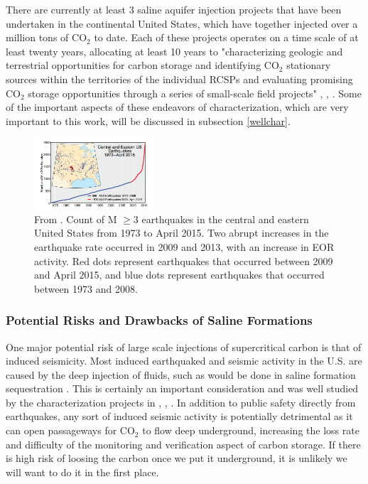 \documentclass[letterpaper, 12pt]{article}
\begin{document}
\par There are currently at least 3 saline aquifer injection projects that have been undertaken in the continental United States, which have together injected over a million tons of CO$_2$ to date. Each of these projects operates on a time scale of at least twenty years, allocating at least 10 years to "characterizing geologic and terrestrial opportunities for carbon storage and identifying CO$_2$ stationary sources within the territories of the individual RCSPs and evaluating promising CO$_2$ storage opportunities through a series of small-scale field projects"  \cite{midwestinject}, \cite{midwestinject2}, \cite{southeastinject}. Some of the important aspects of these endeavors of characterization, which are very important to this work, will be discussed in subsection \ref{wellchar}. 
\setlength{\intextsep}{2pt}%
\begin{figure}%
  \centering
  \includegraphics[width=0.4\textwidth]{induced}
   \caption{\label{inducedfig} From \cite{seis_induced}. Count of M $\geq3$ earthquakes in the central and eastern United States from 1973 to April 2015. Two abrupt increases in the earthquake rate occurred in 2009 and 2013, with an increase in EOR activity. Red dots represent earthquakes that occurred between 2009 and April 2015, and blue dots represent earthquakes that occurred between 1973 and 2008.}
\end{figure}
\subsubsection{Potential Risks and Drawbacks of Saline Formations} 
One major potential risk of large scale injections of supercritical carbon is that of induced seismicity. Most induced earthquaked and seismic activity in the U.S. are caused by the deep injection of fluids, such as would be done in saline formation sequestration \cite{induced}. This is certainly an important consideration and was well studied by the characterization projects in \cite{midwestinject}, \cite{midwestinject2}, \cite{southeastinject}. In addition to public safety directly from earthquakes, any sort of induced seismic activity is potentially detrimental as it can open passageways for CO$_2$ to flow deep underground, increasing the loss rate and difficulty of the monitoring and verification aspect of carbon storage. If there is high risk of loosing the carbon once we put it underground, it is unlikely we will want to do it in the first place. 
\end{document}
